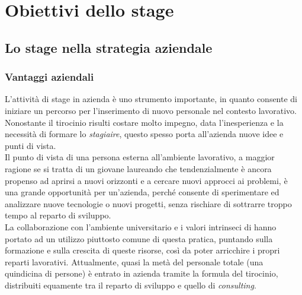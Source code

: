 
\cleardoublepage
\chapter{Obiettivi dello stage}
\label{cap:obiettivi-stage}
\section{Lo stage nella strategia aziendale}
\subsection{Vantaggi aziendali}
L'attività di stage in azienda è uno strumento importante, in quanto consente di iniziare un percorso per l'inserimento di nuovo personale nel contesto lavorativo.\\
Nonostante il tirocinio risulti costare molto impegno, data l'inesperienza e la necessità di formare lo \textit{stagiaire}, questo spesso porta all'azienda nuove idee e punti di vista.\\
Il punto di vista di una persona esterna all'ambiente lavorativo, a maggior ragione se si tratta di un giovane laureando che tendenzialmente è ancora propenso ad aprirsi a nuovi orizzonti e a cercare nuovi approcci ai problemi, è una grande opportunità per un'azienda, perché consente di sperimentare ed analizzare nuove tecnologie o nuovi progetti, senza rischiare di sottrarre troppo tempo al reparto di sviluppo.\\
La collaborazione con l'ambiente universitario e i valori intrinseci di \AD{} hanno portato ad un utilizzo piuttosto comune di questa pratica, puntando sulla formazione e sulla crescita di queste risorse, così da poter arricchire i propri reparti lavorativi. Attualmente, quasi la metà del personale totale (una quindicina di persone) è entrato in azienda tramite la formula del tirocinio, distribuiti equamente tra il reparto di sviluppo e quello di \textit{consulting}.

